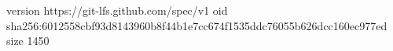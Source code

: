 version https://git-lfs.github.com/spec/v1
oid sha256:6012558cbf93d8143960b8f44b1e7cc674f1535ddc76055b626dcc160ec977ed
size 1450
